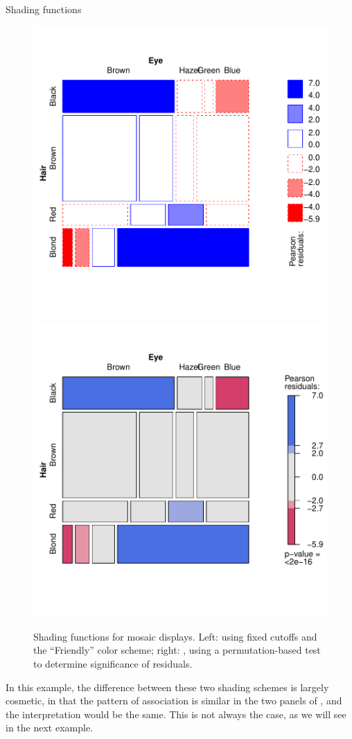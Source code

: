 \documentclass[11pt]{book}
\renewenvironment{knitrout}{\small\renewcommand{\baselinestretch}{.85}}{} %
\begin{document}
\begin{Example}[shading]{Shading functions}
\begin{knitrout}
\color{fgcolor}\begin{kframe}
\begin{alltt}
  
\hlstd{(}\hlstd{)}
 
\end{alltt}
\end{kframe}\begin{figure}[!htbp]


\centerline{\includegraphics[width=.49\textwidth]{ch05/fig/HE-shading1} 
\includegraphics[width=.49\textwidth]{ch05/fig/HE-shading2} }

\caption[Shading functions for mosaic displays]{Shading functions for mosaic displays. Left:  using fixed cutoffs and the ``Friendly'' color scheme; right: , using a permutation-based test to determine significance of residuals.\label{fig:HE-shading}}
\end{figure}


\end{knitrout}
In this example, the difference between these two shading schemes is largely cosmetic, in that
the pattern of association is similar in the two panels of , and the
interpretation would be the same.  This is not always the case, as we will see in the
next example.
\end{Example}
\end{document}
